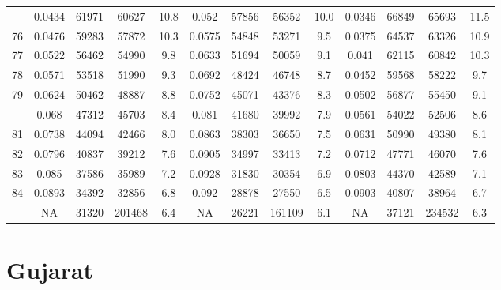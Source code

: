 \documentclass[
  14pt,
]{article}
\begin{document}
\begin{longtable}[t]{lcccccccccccc}
\addlinespace
75 & 0.0434 & 61971 & 60627 & 10.8 & 0.052 & 57856 & 56352 & 10.0 & 0.0346 & 66849 & 65693 & 11.5\\
76 & 0.0476 & 59283 & 57872 & 10.3 & 0.0575 & 54848 & 53271 & 9.5 & 0.0375 & 64537 & 63326 & 10.9\\
77 & 0.0522 & 56462 & 54990 & 9.8 & 0.0633 & 51694 & 50059 & 9.1 & 0.041 & 62115 & 60842 & 10.3\\
78 & 0.0571 & 53518 & 51990 & 9.3 & 0.0692 & 48424 & 46748 & 8.7 & 0.0452 & 59568 & 58222 & 9.7\\
79 & 0.0624 & 50462 & 48887 & 8.8 & 0.0752 & 45071 & 43376 & 8.3 & 0.0502 & 56877 & 55450 & 9.1\\
\addlinespace
80 & 0.068 & 47312 & 45703 & 8.4 & 0.081 & 41680 & 39992 & 7.9 & 0.0561 & 54022 & 52506 & 8.6\\
81 & 0.0738 & 44094 & 42466 & 8.0 & 0.0863 & 38303 & 36650 & 7.5 & 0.0631 & 50990 & 49380 & 8.1\\
82 & 0.0796 & 40837 & 39212 & 7.6 & 0.0905 & 34997 & 33413 & 7.2 & 0.0712 & 47771 & 46070 & 7.6\\
83 & 0.085 & 37586 & 35989 & 7.2 & 0.0928 & 31830 & 30354 & 6.9 & 0.0803 & 44370 & 42589 & 7.1\\
84 & 0.0893 & 34392 & 32856 & 6.8 & 0.092 & 28878 & 27550 & 6.5 & 0.0903 & 40807 & 38964 & 6.7\\
\addlinespace
85 & NA & 31320 & 201468 & 6.4 & NA & 26221 & 161109 & 6.1 & NA & 37121 & 234532 & 6.3\\*
\end{longtable}

\pagebreak

\hypertarget{gujarat}{%
\section{Gujarat}\label{gujarat}}
\end{document}
